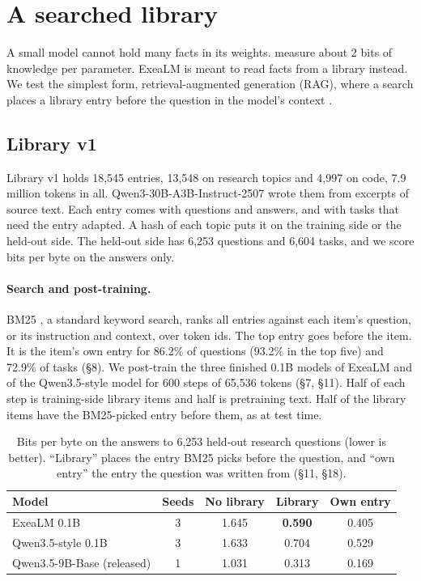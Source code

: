 \documentclass[10pt,twocolumn,letterpaper]{article}
\newcommand{\sect}[1]{\S#1}
\begin{document}
\section{A searched library}
\label{sec:library}

A small model cannot hold many facts in its weights.
\citet{allenzhu2024physics} measure about 2 bits of knowledge per parameter.
ExeaLM is meant to read facts from a library instead.
We test the simplest form, retrieval-augmented generation (RAG), where a search places a library entry before the question in the model's context \citep{lewis2020rag,ram2023incontext}.

\subsection{Library v1}

Library v1 holds 18,545 entries, 13,548 on research topics and 4,997 on code, 7.9 million tokens in all.
Qwen3-30B-A3B-Instruct-2507 \citep{yang2025qwen3} wrote them from excerpts of source text.
Each entry comes with questions and answers, and with tasks that need the entry adapted.
A hash of each topic puts it on the training side or the held-out side.
The held-out side has 6,253 questions and 6,604 tasks, and we score bits per byte on the answers only.

\paragraph{Search and post-training.}
BM25 \citep{robertson2009bm25}, a standard keyword search, ranks all entries against each item's question, or its instruction and context, over token ids.
The top entry goes before the item.
It is the item's own entry for 86.2\% of questions (93.2\% in the top five) and 72.9\% of tasks (\sect{8}).
We post-train the three finished 0.1B models of ExeaLM and of the Qwen3.5-style model for 600 steps of 65,536 tokens (\sect{7}, \sect{11}).
Half of each step is training-side library items and half is pretraining text.
Half of the library items have the BM25-picked entry before them, as at test time.

\begin{table}[t]
\centering\small
\caption{Bits per byte on the answers to 6,253 held-out research questions (lower is better). ``Library'' places the entry BM25 picks before the question, and ``own entry'' the entry the question was written from (\sect{11}, \sect{18}).}
\label{tab:library}
\setlength{\tabcolsep}{3pt}
\begin{tabularx}{\linewidth}{@{}L c c c c@{}}
\toprule
Model & Seeds & No library & Library & Own entry \\
\midrule
ExeaLM 0.1B & 3 & 1.645 & \textbf{0.590} & 0.405 \\
Qwen3.5-style 0.1B & 3 & 1.633 & 0.704 & 0.529 \\
Qwen3.5-9B-Base (released) & 1 & 1.031 & 0.313 & 0.169 \\
\bottomrule
\end{tabularx}
\end{table}
\end{document}
